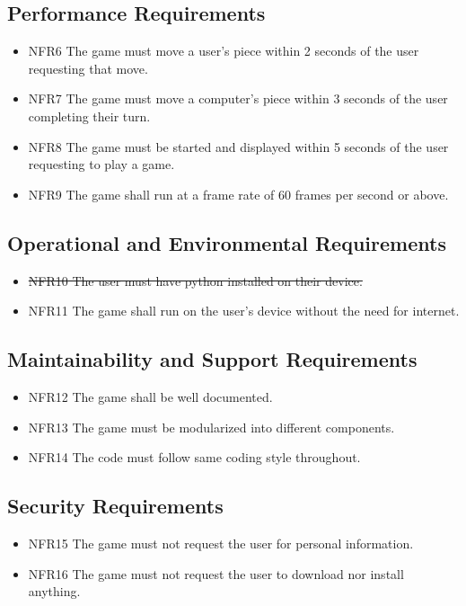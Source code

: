\documentclass[12pt, titlepage]{article}
\begin{document}
\subsection{Performance Requirements}
\begin{itemize}
    \item {NFR6} The game must move a user's piece within 2 seconds of the user requesting that move.
    \item {NFR7} The game must move a computer's piece within 3 seconds of the user completing their turn.
    \item {NFR8} The game must be started and displayed within 5 seconds of the user requesting to play a game.
    \item {NFR9} The game shall run at a frame rate of 60 frames per second or above.
\end{itemize}

\subsection{Operational and Environmental Requirements}
\begin{itemize}
    \item {\color{blue}\st{ {NFR10} The user must have python installed on their device.}}
    \item {NFR11} The game shall run on the user's device without the need for internet.
\end{itemize}

\subsection{Maintainability and Support Requirements}
\begin{itemize}
    \item {NFR12} The game shall be well documented.
    \item {NFR13} The game must be modularized into different components.
    \item {NFR14} The code must follow same coding style throughout. 
\end{itemize}

\subsection{Security Requirements}
\begin{itemize}
    \item {NFR15} The game must not request the user for personal information.
    \item {NFR16} The game must not request the user to download nor install anything.
\end{itemize}
\end{document}
